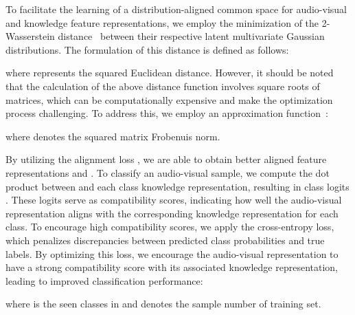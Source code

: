 \documentclass[10pt,twocolumn,letterpaper]{article}
\begin{document}
To facilitate the learning of a distribution-aligned common space for audio-visual and knowledge feature representations, we employ the minimization of the 2-Wasserstein distance~\cite{olkin1982distance} between their respective latent multivariate Gaussian distributions. The formulation of this distance is defined as follows:

where  represents the squared Euclidean distance. However, it should be noted that the calculation of the above distance function involves square roots of matrices, which can be computationally expensive and make the optimization process challenging. To address this, we employ an approximation function~\cite{berthelot2017began,he2018wasserstein}:

where  denotes the squared 
matrix Frobenuis norm.

By utilizing the alignment loss , we are able to obtain better aligned feature representations  and . To classify an audio-visual sample, we compute the dot product between  and each class knowledge representation, resulting in class logits . These logits serve as compatibility scores, indicating how well the audio-visual representation aligns with the corresponding knowledge representation for each class. To encourage high compatibility scores, we apply the cross-entropy loss, which penalizes discrepancies between predicted class probabilities and true labels. By optimizing this loss, we encourage the audio-visual representation to have a strong compatibility score with its associated knowledge representation, leading to improved classification performance:

where  is the seen classes in  and  denotes the sample number of training set. 
\end{document}
